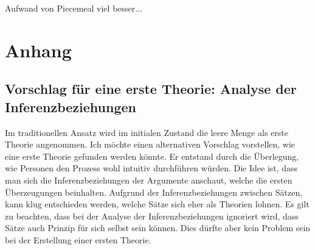 \documentclass{article}
\begin{document}
Aufwand von Piecemeal viel besser... 


\newpage
\printbibliography

\newpage

\section{Anhang}
\subsection{ Vorschlag für eine erste Theorie: Analyse der Inferenzbeziehungen} \label{better-first-theory}
Im traditionellen Ansatz wird im initialen Zustand die leere Menge als erste Theorie angenommen. Ich möchte einen alternativen Vorschlag vorstellen, wie eine erste Theorie gefunden werden könnte. Er entstand durch die Überlegung, wie Personen den Prozess wohl intuitiv durchführen würden. Die Idee ist, dass man sich die Inferenzbeziehungen der Argumente anschaut, welche die ersten Überzeugungen beinhalten. Aufgrund der Inferenzbeziehungen zwischen Sätzen, kann klug entschieden werden, welche Sätze sich eher als Theorien lohnen. Es gilt zu beachten, dass bei der Analyse der Inferenzbeziehungen ignoriert wird, dass Sätze auch Prinzip für sich selbst sein können. Dies dürfte aber kein Problem sein bei der Erstellung einer ersten Theorie.
\end{document}

